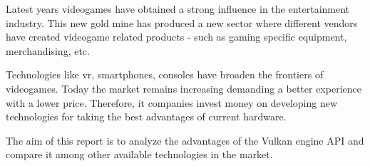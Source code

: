 Latest years videogames have obtained a strong influence in the entertainment industry. This new
gold mine has produced a new sector where different vendors have created videogame related
products - such as gaming specific equipment, merchandising, etc.

Technologies like \gls{vr}, smartphones, consoles have broaden the frontiers of videogames. Today the
market remains increasing demanding a better experience with a lower price. Therefore, \gls{it} companies
invest money on developing new technologies for taking the best advantages of current hardware.

The aim of this report is to analyze the advantages of the Vulkan engine API and compare it among other
available technologies in the market.
